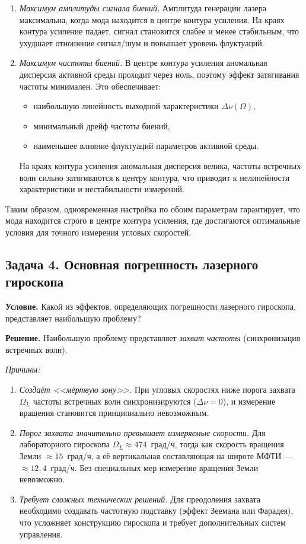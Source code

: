 \documentclass[12pt, a4paper]{article}
\begin{document}
\begin{enumerate}[leftmargin=1.5em]
    \item \textit{Максимум амплитуды сигнала биений.} Амплитуда генерации лазера максимальна, когда мода находится в центре контура усиления. На краях контура усиление падает, сигнал становится слабее и менее стабильным, что ухудшает отношение сигнал/шум и повышает уровень флуктуаций.
    
    \item \textit{Максимум частоты биений.} В центре контура усиления аномальная дисперсия активной среды проходит через ноль, поэтому эффект затягивания частоты минимален. Это обеспечивает:
    \begin{itemize}
        \item наибольшую линейность выходной характеристики $\Delta\nu(\Omega)$,
        \item минимальный дрейф частоты биений,
        \item наименьшее влияние флуктуаций параметров активной среды.
    \end{itemize}
    На краях контура усиления аномальная дисперсия велика, частоты встречных волн сильно затягиваются к центру контура, что приводит к нелинейности характеристики и нестабильности измерений.
\end{enumerate}

Таким образом, одновременная настройка по обоим параметрам гарантирует, что мода находится строго в центре контура усиления, где достигаются оптимальные условия для точного измерения угловых скоростей.


\subsection*{Задача 4. Основная погрешность лазерного гироскопа}

\textbf{Условие.} Какой из эффектов, определяющих погрешности лазерного гироскопа, представляет наибольшую проблему?

\textbf{Решение.} Наибольшую проблему представляет \textit{захват частоты} (синхронизация встречных волн).

\textit{Причины:}
\begin{enumerate}[leftmargin=1.5em]
    \item \textit{Создаёт <<мёртвую зону>>.} При угловых скоростях ниже порога захвата $\Omega_L$ частоты встречных волн синхронизируются ($\Delta\nu = 0$), и измерение вращения становится принципиально невозможным.
    
    \item \textit{Порог захвата значительно превышает измеряемые скорости.} Для лабораторного гироскопа $\Omega_L \approx 474$~град/ч, тогда как скорость вращения Земли $\approx 15$~град/ч, а её вертикальная составляющая на широте МФТИ --- $\approx 12{,}4$~град/ч. Без специальных мер измерение вращения Земли невозможно.
    
    \item \textit{Требует сложных технических решений.} Для преодоления захвата необходимо создавать частотную подставку (эффект Зеемана или Фарадея), что усложняет конструкцию гироскопа и требует дополнительных систем управления.
\end{enumerate}
\end{document}
